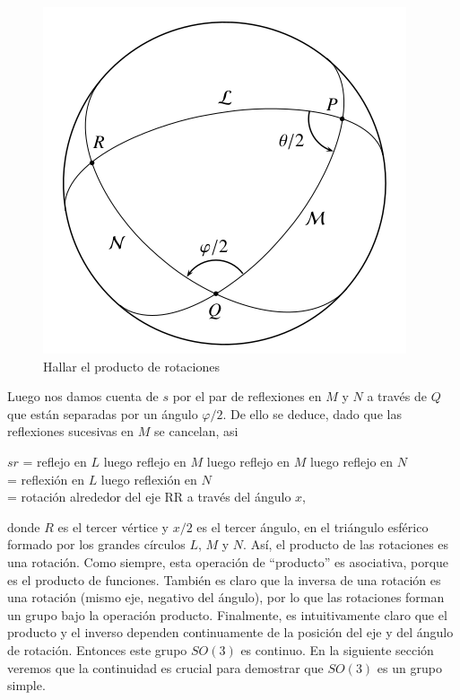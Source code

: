 \documentclass[11pt]{book}
\numberwithin{equation}{section}
\theoremstyle{plain}  %
\begin{document}
\newpage
\begin{figure}[h]
\centering
\includegraphics[scale=0.5]{imagenes/23.3-2.png}
\caption{Hallar el producto de rotaciones}
\end{figure}

Luego nos damos cuenta de $s$ por el par de reflexiones en $M$ y $N$ a través de $Q$ que están separadas por un ángulo $\varphi/2$. De ello se deduce, dado que las reflexiones sucesivas en $M$ se cancelan, asi

\begin{center}
    $sr$ = reflejo en $L$ luego reflejo en $M$ luego reflejo en $M$ luego reflejo en $N$ \\
    = reflexión en $L$ luego reflexión en $N$ \\
    = rotación alrededor del eje RR a través del ángulo $x$,
\end{center}
donde $R$ es el tercer vértice y $x/2$ es el tercer ángulo, en el
triángulo esférico formado por los grandes círculos $L$, $M$ y $N$.
Así, el producto de las rotaciones es una rotación. Como
siempre, esta operación de “producto” es asociativa, porque es
el producto de funciones. También es claro que la inversa de
una rotación es una rotación (mismo eje, negativo del ángulo),
por lo que las rotaciones forman un grupo bajo la operación
producto. Finalmente, es intuitivamente claro que el producto y
el inverso dependen continuamente de la posición del eje y del
ángulo de rotación. Entonces este grupo $SO(3)$ es continuo. En
la siguiente sección veremos que la continuidad es crucial para
demostrar que $SO(3)$ es un grupo simple.
\end{document}
